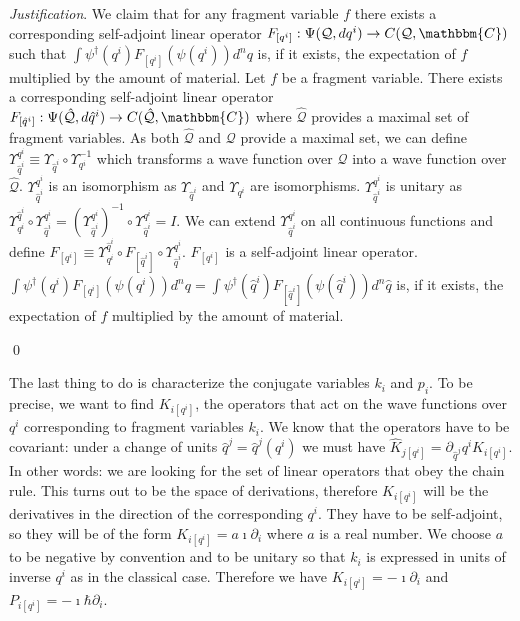 \documentclass[aps,pra,10pt,twocolumn,floatfix,nofootinbib]{revtex4-1}
\numberwithin{equation}{section}
\theoremstyle{definition}
\newenvironment{justification}{\emph{Justification}.}{\qed}
\begin{document}
\begin{justification}
	We claim that for any fragment variable $f$ there exists a corresponding self-adjoint linear operator $F_{[q^i]} : \Psi(\mathcal{Q}, dq^i) \rightarrow C(\mathcal{Q}, \mathbbm{C})$ such that $\int \psi^\dagger(q^i) F_{[q^i]}( \psi(q^i)) d^nq$ is, if it exists, the expectation of $f$ multiplied by the amount of material. Let $f$ be a fragment variable. There exists a corresponding self-adjoint linear operator $F_{[\hat{q}^i]} : \Psi(\hat{\mathcal{Q}}, d\hat{q}^i) \rightarrow C(\hat{\mathcal{Q}}, \mathbbm{C})$ where $\hat{\mathcal{Q}}$ provides a maximal set of fragment variables. As both $\hat{\mathcal{Q}}$ and $\mathcal{Q}$ provide a maximal set, we can define $\Upsilon^{q^i}_{\hat{q}^i} \equiv \Upsilon_{\hat{q}^i} \circ \Upsilon_{q^i}^{-1}$ which transforms a wave function over $\mathcal{Q}$ into a wave function over $\hat{\mathcal{Q}}$. $\Upsilon^{q^i}_{\hat{q}^i}$ is an isomorphism as $\Upsilon_{\hat{q}^i}$ and $\Upsilon_{q^i}$ are isomorphisms. $\Upsilon^{q^i}_{\hat{q}^i}$ is unitary as $\Upsilon^{\hat{q}^i}_{q^i} \circ \Upsilon^{q^i}_{\hat{q}^i} = (\Upsilon^{q^i}_{\hat{q}^i})^{-1} \circ \Upsilon^{q^i}_{\hat{q}^i} = I$. We can extend $\Upsilon^{q^i}_{\hat{q}^i}$ on all continuous functions and define $F_{[q^i]} \equiv \Upsilon^{\hat{q}^i}_{q^i} \circ F_{[\hat{q}^i]} \circ \Upsilon^{q^i}_{\hat{q}^i}$. $F_{[q^i]}$ is a self-adjoint linear operator. $\int \psi^\dagger(q^i) F_{[q^i]}( \psi(q^i)) d^nq = \int \psi^\dagger(\hat{q}^i) F_{[\hat{q}^i]}( \psi(\hat{q}^i)) d^n \hat{q}$ is, if it exists, the expectation of $f$ multiplied by the amount of material.

\end{justification}

The last thing to do is characterize the conjugate variables $k_i$ and $p_i$. To be precise, we want to find $K_{i [q^i]}$, the operators that act on the wave functions over $q^i$ corresponding to fragment variables $k_i$. We know that the operators have to be covariant: under a change of units $\hat{q}^j = \hat{q}^j(q^i)$ we must have $\hat{K}_{j[q^i]} = \partial_{\hat{q}^j} q^i K_{i [q^i]}$. In other words: we are looking for the set of linear operators that obey the chain rule. This turns out to be the space of derivations, therefore $K_{i [q^i]}$ will be the derivatives in the direction of the corresponding $q^i$. They have to be self-adjoint, so they will be of the form $K_{i [q^i]} = a \imath \partial_{i}$ where $a$ is a real number. We choose $a$ to be negative by convention and to be unitary so that $k_i$ is expressed in units of inverse $q^i$ as in the classical case. Therefore we have $K_{i [q^i]} = -\imath \partial_i$ and $P_{i [q^i]} = -\imath \hbar \partial_i$.
\end{document}
